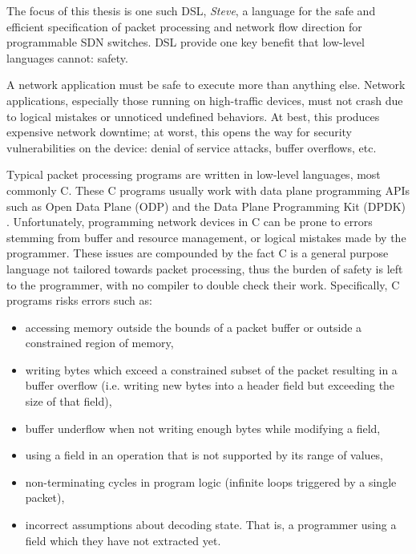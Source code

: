 The focus of this thesis is one such DSL, \emph{Steve}, a language for the safe
and
efficient specification of packet processing and network flow direction
for programmable SDN switches. DSL provide one key benefit that low-level
languages cannot: safety.

A network application must be safe to execute more than anything else.
Network applications, especially those running on high-traffic devices, must not
crash due to logical mistakes or unnoticed undefined behaviors.
At best, this produces expensive network downtime; at worst, this
opens the way for security vulnerabilities on the device: 
denial of service attacks, buffer overflows, etc.

Typical packet processing programs are written in low-level languages, most
commonly C. These C programs usually work with data plane programming APIs such
as Open Data Plane (ODP) \cite{odp_webpage} and the Data Plane Programming Kit
(DPDK) \cite{dpdk_webpage}. Unfortunately, programming network devices in C can be prone
to errors stemming from buffer and resource management, or logical mistakes made by the programmer. 
These issues are compounded by the fact C is a general
purpose language not tailored towards packet processing, thus the burden of
safety
is left to the programmer, with no compiler to double check their work.
Specifically, C programs risks errors such as:

\begin{itemize}
\item accessing memory outside the bounds of a packet buffer or outside a
constrained
region of memory,

\item writing bytes which exceed a constrained subset of the packet
resulting in a buffer overflow (i.e. writing new bytes into a header field
but exceeding the size of that field),

\item buffer underflow when not writing enough bytes while modifying
a field,

\item using a field in an operation that is not supported by its
range of values,

\item non-terminating cycles in program logic (infinite loops
triggered by a single packet),

\item incorrect assumptions about decoding state. That is, a programmer using
a field which they have not extracted yet.
\end{itemize}

